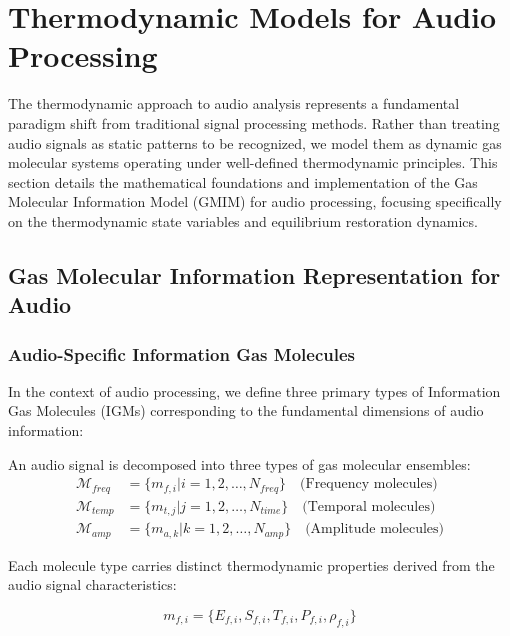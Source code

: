\section{Thermodynamic Models for Audio Processing}

The thermodynamic approach to audio analysis represents a fundamental paradigm shift from traditional signal processing methods. Rather than treating audio signals as static patterns to be recognized, we model them as dynamic gas molecular systems operating under well-defined thermodynamic principles. This section details the mathematical foundations and implementation of the Gas Molecular Information Model (GMIM) for audio processing, focusing specifically on the thermodynamic state variables and equilibrium restoration dynamics.

\subsection{Gas Molecular Information Representation for Audio}

\subsubsection{Audio-Specific Information Gas Molecules}

In the context of audio processing, we define three primary types of Information Gas Molecules (IGMs) corresponding to the fundamental dimensions of audio information:

\begin{definition}
An audio signal is decomposed into three types of gas molecular ensembles:
\begin{align}
\mathcal{M}_{freq} &= \{m_{f,i} | i = 1, 2, \ldots, N_{freq}\} \quad \text{(Frequency molecules)} \\
\mathcal{M}_{temp} &= \{m_{t,j} | j = 1, 2, \ldots, N_{time}\} \quad \text{(Temporal molecules)} \\
\mathcal{M}_{amp} &= \{m_{a,k} | k = 1, 2, \ldots, N_{amp}\} \quad \text{(Amplitude molecules)}
\end{align}
\end{definition}

Each molecule type carries distinct thermodynamic properties derived from the audio signal characteristics:

\begin{equation}
m_{f,i} = \{E_{f,i}, S_{f,i}, T_{f,i}, P_{f,i}, \rho_{f,i}\}
\end{equation}

